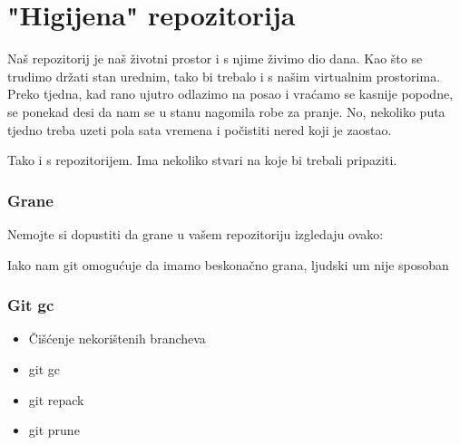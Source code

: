 \chapter*{"Higijena" repozitorija}

Naš repozitorij je naš životni prostor i s njime živimo dio dana.
Kao što se trudimo držati stan urednim, tako bi trebalo i s našim virtualnim prostorima.
Preko tjedna, kad rano ujutro odlazimo na posao i vraćamo se kasnije popodne, se ponekad desi da nam se u stanu nagomila robe za pranje.
No, nekoliko puta tjedno treba uzeti pola sata vremena i počistiti nered koji je zaostao.

Tako i s repozitorijem.
Ima nekoliko stvari na koje bi trebali pripaziti.

\subsection*{Grane}

Nemojte si dopustiti da grane u vašem repozitoriju izgledaju ovako:



Iako nam git omogućuje da imamo beskonačno grana, ljudski um nije sposoban

\subsection*{Git gc}

\begin{itemize}
   \item Čišćenje nekorištenih brancheva
   \item git gc
   \item git repack
   \item git prune
\end{itemize}


